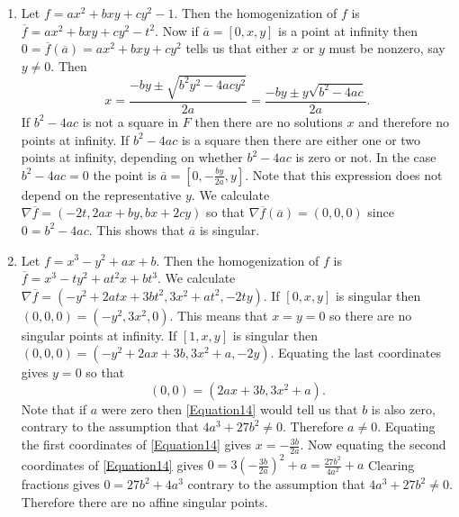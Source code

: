 \documentclass[12pt]{article}
\begin{document}
\begin{enumerate}
\item %
Let $f=ax^2+bxy+cy^2-1$. Then the homogenization of $f$
is $\overline{f}=ax^2+bxy+cy^2-t^2$. Now if
$\overline{a}=\left[0,x,y\right]$ is a point at infinity
then $0=\overline{f}\left(\overline{a}\right)=ax^2+bxy+cy^2$ tells us
that either $x$ or $y$ must be nonzero, say $y\ne 0$. Then
\[x=\frac{-by\pm\sqrt{b^2y^2-4acy^2}}{2a}
=\frac{-by\pm y\sqrt{b^2-4ac}}{2a}.\]
If $b^2-4ac$ is not a square in $F$ then there are no solutions
$x$ and therefore no points at infinity.
If $b^2-4ac$ is a square then there are either
one or two points at infinity, depending on whether $b^2-4ac$
is zero or not. In the case $b^2-4ac=0$ the point
is $\overline{a}=\left[0,-\frac{by}{2a},y\right]$.
Note that this expression does not depend on the representative $y$.
We calculate $\nabla\overline{f}=\left(
-2t,2ax+by,bx+2cy\right)$ so that
$\nabla\overline{f}\left(\overline{a}\right)=\left(
0,0,0\right)$ since $0=b^2-4ac$.
This shows that $\overline{a}$ is singular.

\item %
Let $f=x^3-y^2+ax+b$. Then the homogenization of $f$
is $\overline{f}=x^3-ty^2+at^2x+bt^3$. We calculate
$\nabla\overline{f}=\left(-y^2+2atx+3bt^2,3x^2+at^2,-2ty\right)$.
If $\left[0,x,y\right]$ is singular then
$\left(0,0,0\right)=\left(-y^2,3x^2,0\right)$.
This means that $x=y=0$ so there are no singular points at infinity.
If $\left[1,x,y\right]$ is singular then
$\left(0,0,0\right)=\left(-y^2+2ax+3b,3x^2+a,-2y\right)$.
Equating the last coordinates gives $y=0$ so that
\begin{equation}\label{Equation14}
\left(0,0\right)=\left(2ax+3b,3x^2+a\right).
\end{equation}
Note that if $a$ were zero then \autoref{Equation14}
would tell us that $b$ is also zero, contrary to the
assumption that $4a^3+27b^2\ne 0$. Therefore $a\ne 0$.
Equating the first coordinates of \autoref{Equation14}
gives $x=-\frac{3b}{2a}$.
Now equating the second coordinates of \autoref{Equation14}
gives $0=3\left(-\frac{3b}{2a}\right)^2+a=\frac{27b^2}{4a^2}+a$
Clearing fractions gives $0=27b^2+4a^3$ contrary to the
assumption that $4a^3+27b^2\ne 0$. Therefore there are no
affine singular points.
\end{enumerate}
\end{document}
